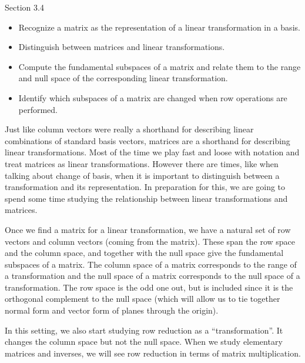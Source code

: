\documentclass{problemset}
\begin{document}
\begin{lesson}

	Section 3.4

	\begin{itemize}
		\item Recognize a matrix as the representation of a linear transformation in a basis.
		\item Distinguish between matrices and linear transformations.
		\item Compute the fundamental subspaces of a matrix and relate them to the range and null space
			of the corresponding linear transformation.
		\item Identify which subspaces of a matrix are changed when row operations are performed.
	\end{itemize}

		Just like column vectors were really a shorthand for describing linear combinations
		of standard basis vectors,
		matrices are a shorthand for describing linear transformations. Most of the time we play fast
		and loose with notation and treat matrices as linear transformations. However there are times,
		like when talking about change of basis, when it is important to distinguish between
		a transformation and its representation. In preparation for this, we are going to spend some
		time studying the relationship between linear transformations and matrices.

		Once we find a matrix for a linear transformation, we have a natural set of row vectors and column
		vectors (coming from the matrix). These span the row space and the column space,
		and together with the null space give the fundamental subspaces of a matrix. The column space of
		a matrix corresponds to the range of a transformation and the null space of a matrix corresponds
		to the null space of a transformation. The row space is the odd one out, but is included since it is
		the orthogonal complement to the null space (which will allow us to tie together normal form and vector
		form of planes through the origin).

		In this setting, we also start studying row reduction as a ``transformation''. It changes
		the column space but not the null space. When we study elementary matrices and inverses, we will
		see row reduction in terms of matrix multiplication.

\end{lesson}
\end{document}
